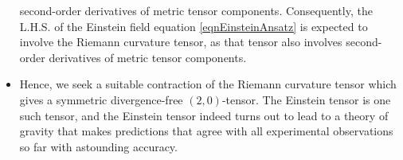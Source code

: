 \begin{itemize}
	second-order derivatives of metric tensor components.
	Consequently, the L.H.S. of the Einstein field equation \eqref{eqnEinsteinAnsatz} is expected to involve
	the Riemann curvature tensor, as that tensor also involves second-order derivatives of metric tensor components.
\item
	Hence, we seek a suitable contraction of the Riemann curvature tensor
	which gives a symmetric divergence-free $(2,0)$-tensor.
	The Einstein tensor is one such tensor, and the Einstein tensor
	indeed turns out to lead to a theory of gravity that makes predictions that agree
	with all experimental observations so far with astounding accuracy.
\end{itemize}


\vskip 0.3cm
\noindent




